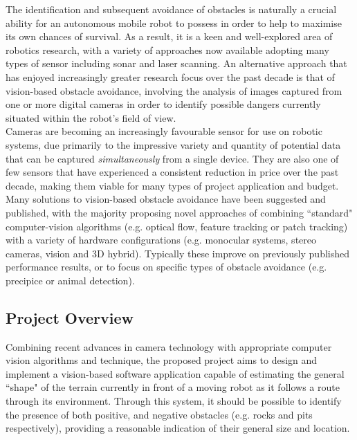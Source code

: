 \documentclass[10pt,fleqn,twoside]{article}
\begin{document}
The identification and subsequent avoidance of obstacles is naturally a crucial ability for an autonomous mobile robot to possess in order to help to maximise its own chances of survival. As a result, it is a keen and well-explored area of robotics research, with a variety of approaches now available adopting many types of sensor including sonar and laser scanning. An alternative approach that has enjoyed increasingly greater research focus over the past decade is that of vision-based obstacle avoidance, involving the analysis of images captured from one or more digital cameras in order to identify possible dangers currently situated within the robot's field of view. \\

Cameras are becoming an increasingly favourable sensor for use on robotic systems, due primarily to the impressive variety and quantity of potential data that can be captured \textit{simultaneously} from a single device. They are also one of few sensors that have experienced a consistent reduction in price over the past decade, making them viable for many types of project application and budget. \\

Many solutions to vision-based obstacle avoidance have been suggested and published, with the majority proposing novel approaches of combining ``standard" computer-vision algorithms (e.g. optical flow, feature tracking or patch tracking) with a variety of hardware configurations (e.g. monocular systems, stereo cameras, vision and 3D hybrid). Typically these improve on previously published performance results, or to focus on specific types of obstacle avoidance (e.g. precipice or animal detection).

\subsection{Project Overview}

Combining recent advances in camera technology with appropriate computer vision algorithms and technique, the proposed project aims to design and implement a vision-based software application capable of estimating the general ``shape" of the terrain currently in front of a moving robot as it follows a route through its environment. Through this system, it should be possible to identify the presence of both positive, and negative obstacles (e.g. rocks and pits respectively), providing a reasonable indication of their general size and location. \\
\end{document}
